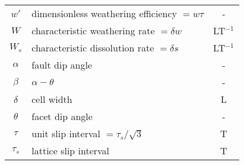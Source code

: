 \documentclass[11pt, oneside]{article}   	%
\begin{document}
\begin{table}[htbp]
\begin{tabular}{clc}
      $w'$ & dimensionless weathering efficiency $=w\tau$ & - \\
      $W$ & characteristic weathering rate $=\delta w$ & LT$^{-1}$ \\
      $W_s$ & characteristic dissolution rate $=\delta s$ & LT$^{-1}$ \\
      $\alpha$      & fault dip angle & - \\
      $\beta$          & $\alpha - \theta$ &  - \\
      $\delta$ & cell width & L \\
      $\theta$ & facet dip angle & - \\
      $\tau$ & unit slip interval $=\tau_s / \sqrt{3}$ & T \\
      $\tau_s$ & lattice slip interval & T \\
      \bottomrule
   \end{tabular}
   \label{tab:symbols}
\end{table}
\end{document}
